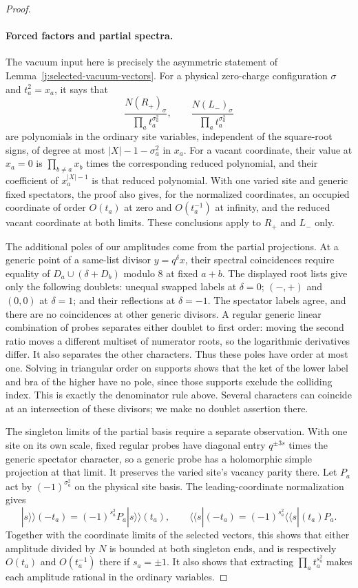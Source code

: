\begin{proof}
\paragraph{Forced factors and partial spectra.}
The vacuum input here is precisely the asymmetric statement of
Lemma~\ref{j:selected-vacuum-vectors}. For a physical zero-charge
configuration $\sigma$ and $t_a^2=x_a$, it says that
\[
 \frac{N(R_+)_\sigma}{\prod_a t_a^{\sigma_a^2}},
 \qquad
 \frac{N(L_-)_\sigma}{\prod_a t_a^{\sigma_a^2}}
\]
are polynomials in the ordinary site variables, independent of the
square-root signs, of degree at most $|X|-1-\sigma_a^2$ in $x_a$.
For a vacant coordinate, their value at $x_a=0$ is
$\prod_{b\ne a}x_b$ times the corresponding reduced polynomial,
and their coefficient of $x_a^{|X|-1}$ is that reduced polynomial.
With one varied site and generic fixed spectators, the proof also
gives, for the normalized coordinates, an occupied coordinate of
order $O(t_a)$ at zero and $O(t_a^{-1})$ at infinity, and the
reduced vacant coordinate at both limits. These conclusions apply
to $R_+$ and $L_-$ only.

The additional poles of our amplitudes come from the partial
projections. At a generic point of a same-list divisor
$y=q^\delta x$, their spectral coincidences require equality of
$D_a\cup(\delta+D_b)$ modulo 8 at fixed $a+b$. The displayed root
lists give only the following doublets: unequal swapped labels at
$\delta=0$; $(-,+)$ and $(0,0)$ at $\delta=1$; and their reflections
at $\delta=-1$. The spectator labels agree, and there are no
coincidences at other generic divisors. A regular generic linear
combination of probes separates either doublet to first order:
moving the second ratio moves a different multiset of numerator
roots, so the logarithmic derivatives differ. It also separates
the other characters. Thus these poles have order at most one.
Solving in triangular order on supports shows that the ket of the
lower label and bra of the higher have no pole, since those supports
exclude the colliding index. This is exactly the denominator rule
above. Several characters can coincide at an intersection of these
divisors; we make no doublet assertion there.

The singleton limits of the partial basis require a separate
observation. With one site on its own scale, fixed regular probes
have diagonal entry $q^{\pm3s}$ times the generic spectator
character, so a generic probe has a holomorphic simple projection
at that limit. It preserves the varied site's vacancy parity there.
Let $P_a$ act by $(-1)^{\sigma_a^2}$ on the physical site basis.
The leading-coordinate normalization gives
\[
 |s\rangle\rangle(-t_a)
   =(-1)^{s_a^2}P_a|s\rangle\rangle(t_a),\qquad
 \langle\langle s|(-t_a)
   =(-1)^{s_a^2}\langle\langle s|(t_a)P_a.
\]
Together with the coordinate limits of the selected vectors, this
shows that either amplitude divided by $N$ is bounded at both
singleton ends, and is respectively $O(t_a)$ and $O(t_a^{-1})$
there if $s_a=\pm1$. It also shows that extracting
$\prod_a t_a^{s_a^2}$ makes each amplitude rational in the ordinary
variables.


\end{proof}
